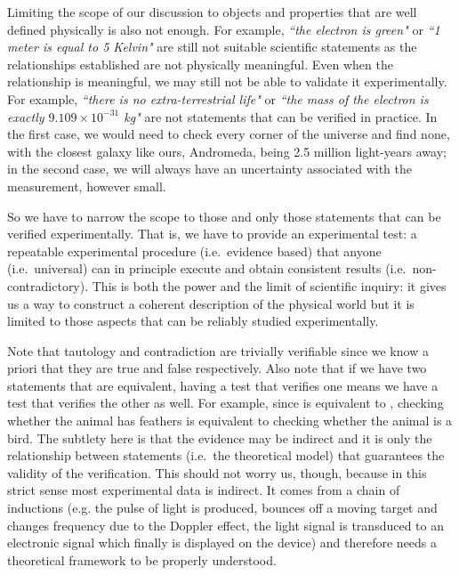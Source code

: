 \documentclass[11pt,letterpaper,fleqn]{memoir} %
\begin{document}
Limiting the scope of our discussion to objects and properties that are well defined physically is also not enough. For example, \emph{``the electron is green"} or \emph{``1 meter is equal to 5 Kelvin"} are still not suitable scientific statements as the relationships established are not physically meaningful. Even when the relationship is meaningful, we may still not be able to validate it experimentally. For example, \emph{``there is no extra-terrestrial life"} or \emph{``the mass of the electron is exactly $9.109 \times 10^{-31}$ kg"} are not statements that can be verified in practice. In the first case, we would need to check every corner of the universe and find none, with the closest galaxy like ours, Andromeda, being 2.5 million light-years away; in the second case, we will always have an uncertainty associated with the measurement, however small.

So we have to narrow the scope to those and only those statements that can be verified experimentally. That is, we have to provide an experimental test: a repeatable experimental procedure (i.e.~evidence based) that anyone (i.e.~universal) can in principle execute and obtain consistent results (i.e.~non-contradictory). This is both the power and the limit of scientific inquiry: it gives us a way to construct a coherent description of the physical world but it is limited to those aspects that can be reliably studied experimentally.

Note that tautology and contradiction are trivially verifiable since we know a priori that they are true and false respectively. Also note that if we have two statements that are equivalent, having a test that verifies one means we have a test that verifies the other as well. For example, since  is equivalent to , checking whether the animal has feathers is equivalent to checking whether the animal is a bird. The subtlety here is that the evidence may be indirect and it is only the relationship between statements (i.e.~the theoretical model) that guarantees the validity of the verification. This should not worry us, though, because in this strict sense most experimental data is indirect. It comes from a chain of inductions (e.g. the pulse of light is produced, bounces off a moving target and changes frequency due to the Doppler effect, the light signal is transduced to an electronic signal which finally is displayed on the device) and therefore needs a theoretical framework to be properly understood.
\end{document}
